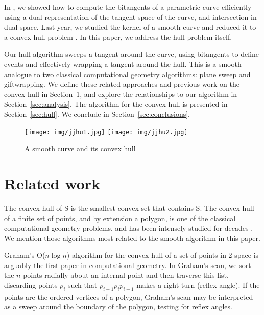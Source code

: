 \documentclass[11pt]{article}
\begin{document}
In \cite{jj01}, we showed how to compute the bitangents of a parametric curve
efficiently using a dual representation of the tangent space of the curve,
and intersection in dual space.
Last year, we studied the kernel of a smooth curve 
and reduced it to a convex hull problem \cite{jj03}.
In this paper, we address the hull problem itself.

Our hull algorithm sweeps a tangent around the curve, 
using bitangents to define events %
and effectively wrapping a tangent around the hull.
This is a smooth analogue to two classical computational geometry algorithms:
plane sweep and giftwrapping.
We define these related approaches and previous work on the convex hull in Section~\ref{sec:work},
and explore the relationships to our algorithm in Section~\ref{sec:analysis}.
The algorithm for the convex hull is presented in Section~\ref{sec:hull}.
We conclude in Section~\ref{sec:conclusions}.

\begin{figure}[h]
\begin{center}
\texttt{[image: img/jjhu1.jpg]}
\texttt{[image: img/jjhu2.jpg]}
\end{center}
\caption{A smooth curve and its convex hull}
\label{fig:curveob1b}
\end{figure}


\section{Related work}
\label{sec:work}

The convex hull of S is the smallest convex set that contains S.
The convex hull of a finite set of points, and by extension a polygon,
is one of the classical computational geometry problems,
and has been intensely studied for decades \cite{preparata85}.
We mention those algorithms most related to the smooth algorithm in this paper.

Graham's O($n \log n$) algorithm for the convex hull of a set of points in 2-space
 \cite{graham72}
is arguably the first paper in computational geometry. %
In Graham's scan, we sort the $n$ points radially about an internal point
and then traverse this list, discarding points $p_i$ such that
$p_{i-1} p_i p_{i+1}$ makes a right turn (reflex angle).
If the points are the ordered vertices of a polygon,
Graham's scan may be interpreted as a sweep around 
the boundary of the polygon, testing for reflex angles.
\end{document}
